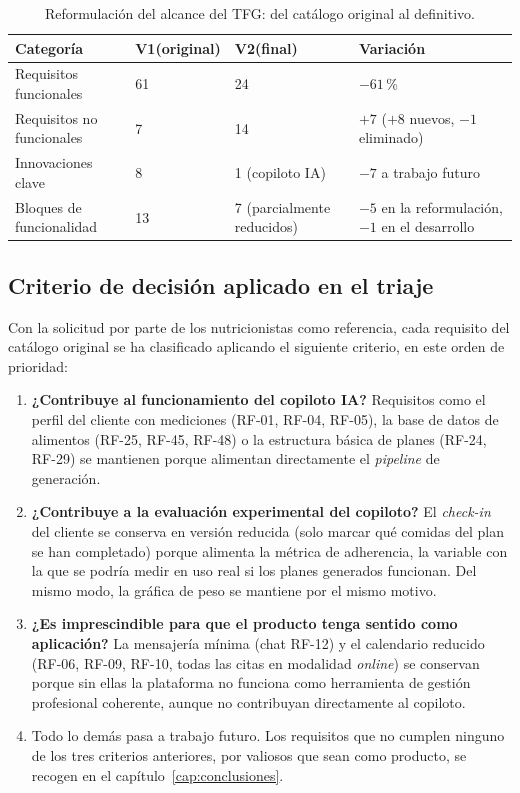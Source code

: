 \begin{table}[htbp]
\centering
\small
\begin{tabular}{|p{3.7cm}|p{2.4cm}|p{3.1cm}|p{3.3cm}|}
\hline
\textbf{Categoría} & \textbf{V1}\newline\textbf{(original)} & \textbf{V2}\newline\textbf{(final)} & \textbf{Variación} \\
\hline
Requisitos funcionales & 61 & 24 & $-61$\,\% \\
\hline
Requisitos no funcionales & 7 & 14 & $+7$ ($+8$ nuevos, $-1$ eliminado) \\
\hline
Innovaciones clave & 8 & 1 (copiloto IA) & $-7$ a trabajo futuro \\
\hline
Bloques de funcionalidad & 13 & 7 (parcialmente reducidos) & $-5$ en la reformulación, $-1$ en el desarrollo \\
\hline
\end{tabular}
\caption{Reformulación del alcance del TFG: del catálogo original al definitivo.}
\label{tab:reformulacionResumen}
\end{table}

\subsection{Criterio de decisión aplicado en el triaje}

Con la solicitud por parte de los nutricionistas como referencia, cada requisito del catálogo original se ha clasificado aplicando el siguiente criterio, en este orden de prioridad:

\begin{enumerate}
    \item \textbf{¿Contribuye al funcionamiento del copiloto IA?} Requisitos como el perfil del cliente con mediciones (RF-01, RF-04, RF-05), la base de datos de alimentos (RF-25, RF-45, RF-48) o la estructura básica de planes (RF-24, RF-29) se mantienen porque alimentan directamente el \textit{pipeline} de generación.
    \item \textbf{¿Contribuye a la evaluación experimental del copiloto?} El \textit{check-in} del cliente se conserva en versión reducida (solo marcar qué comidas del plan se han completado) porque alimenta la métrica de adherencia, la variable con la que se podría medir en uso real si los planes generados funcionan. Del mismo modo, la gráfica de peso se mantiene por el mismo motivo.
    \item \textbf{¿Es imprescindible para que el producto tenga sentido como aplicación?} La mensajería mínima (chat RF-12) y el calendario reducido (RF-06, RF-09, RF-10, todas las citas en modalidad \textit{online}) se conservan porque sin ellas la plataforma no funciona como herramienta de gestión profesional coherente, aunque no contribuyan directamente al copiloto.
    \item Todo lo demás pasa a trabajo futuro. Los requisitos que no cumplen ninguno de los tres criterios anteriores, por valiosos que sean como producto, se recogen en el capítulo~\ref{cap:conclusiones}.
\end{enumerate}

